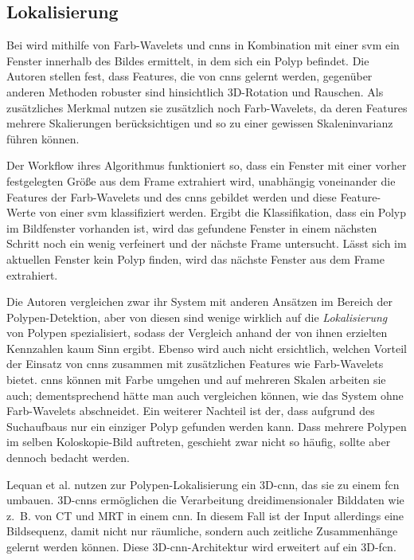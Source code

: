 \subsection{Lokalisierung}

Bei \cite{Billah.2017} wird mithilfe von Farb-Wavelets und \glspl{cnn} in Kombination mit einer \gls{svm} ein Fenster innerhalb des Bildes ermittelt, in dem sich ein Polyp befindet.
Die Autoren stellen fest, dass Features, die von \glspl{cnn} gelernt werden, gegenüber anderen Methoden robuster sind hinsichtlich 3D-Rotation und Rauschen.
Als zusätzliches Merkmal nutzen sie zusätzlich noch Farb-Wavelets, da deren Features mehrere Skalierungen berücksichtigen und so zu einer gewissen Skaleninvarianz führen können.

Der Workflow ihres Algorithmus funktioniert so, dass ein Fenster mit einer vorher festgelegten Größe aus dem Frame extrahiert wird, unabhängig voneinander die Features der Farb-Wavelets und des \gls{cnn}s gebildet werden und diese Feature-Werte von einer \gls{svm} klassifiziert werden.
Ergibt die Klassifikation, dass ein Polyp im Bildfenster vorhanden ist, wird das gefundene Fenster in einem nächsten Schritt noch ein wenig verfeinert und der nächste Frame untersucht.
Lässt sich im aktuellen Fenster kein Polyp finden, wird das nächste Fenster aus dem Frame extrahiert.

Die Autoren vergleichen zwar ihr System mit anderen Ansätzen im Bereich der Polypen-Detektion, aber von diesen sind wenige wirklich auf die \emph{Lokalisierung} von Polypen spezialisiert, sodass der Vergleich anhand der von ihnen erzielten Kennzahlen kaum Sinn ergibt.
Ebenso wird auch nicht ersichtlich, welchen Vorteil der Einsatz von \glspl{cnn} zusammen mit zusätzlichen Features wie Farb-Wavelets bietet.
\glspl{cnn} können mit Farbe umgehen und auf mehreren Skalen arbeiten sie auch; dementsprechend hätte man auch vergleichen können, wie das System ohne Farb-Wavelets abschneidet.
Ein weiterer Nachteil ist der, dass aufgrund des Suchaufbaus nur ein einziger Polyp gefunden werden kann.
Dass mehrere Polypen im selben Koloskopie-Bild auftreten, geschieht zwar nicht so häufig, sollte aber dennoch bedacht werden.

Lequan et al. \cite{Lequan.2017} nutzen zur Polypen-Lokalisierung ein 3D-\gls{cnn}, das sie zu einem \gls{fcn} umbauen.
3D-\glspl{cnn} ermöglichen die Verarbeitung dreidimensionaler Bilddaten wie z.~B. von CT und MRT in einem \gls{cnn}.
In diesem Fall ist der Input allerdings eine Bildsequenz, damit nicht nur räumliche, sondern auch zeitliche Zusammenhänge gelernt werden können.
Diese 3D-\gls{cnn}-Architektur wird erweitert auf ein 3D-\gls{fcn}.

